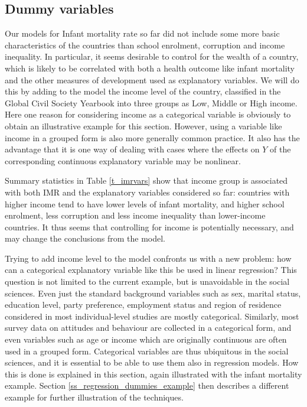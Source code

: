 \subsection{Dummy variables}
\label{ss_regression_dummies_def}

Our models for Infant mortality rate so far did not
include  some more basic characteristics of the
countries than school enrolment, corruption and income inequality. In
particular, it seems desirable to control for the wealth of a
country, which is likely to be correlated with both a health outcome
like infant mortality and the other measures of development used as
explanatory variables. We will do this by adding to the model the income
level of the country, classified in the Global Civil Society Yearbook
into three groups as Low, Middle or High income. Here one reason for
considering income as a categorical variable is obviously to obtain an
illustrative example for this section. However, using a variable like
income in a grouped form is also more generally common practice.
It also has the advantage that it is one way of dealing with cases where
the effects on $Y$ of the corresponding continuous explanatory
variable may be nonlinear.

Summary statistics in Table \ref{t_imrvars} show that income group is
associated with both IMR and the explanatory variables considered
so far: countries with higher income tend to have lower levels of infant
mortality, and higher school enrolment, less corruption and less income
inequality than lower-income countries. It thus seems that controlling
for income is potentially necessary, and may change the
conclusions from the model.

Trying to add income level to the model confronts us with a new problem:
how can a categorical explanatory variable like this be used in linear
regression? This question is not limited to the current example, but is
unavoidable in the social sciences. Even just the standard background
variables such as sex, marital status, education level, party
preference, employment status and region of residence considered in most
individual-level studies are mostly categorical. Similarly, most survey
data on attitudes and behaviour are collected in a categorical form, and
even variables such as age or income which are originally continuous are
often used in a grouped form. Categorical variables are thus ubiquitous
in the social sciences, and it is essential to be able to use them also
in regression models. How this is done is explained in this section,
again illustrated with the infant
mortality example. Section \ref{ss_regression_dummies_example} then
describes a different example for further illustration of the
techniques.


